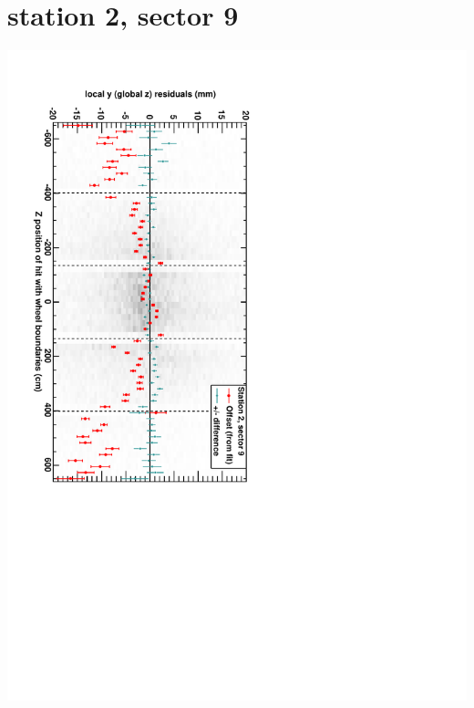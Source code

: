 \documentclass[compress]{beamer}
\begin{document}
\section*{station 2, sector 9}
\begin{frame} \vfill \mbox{\hspace{-1 cm}\includegraphics[height=1.2\linewidth, angle=90]{DTzVsZ_st2_sr09.pdf}} \end{frame}
\end{document}
